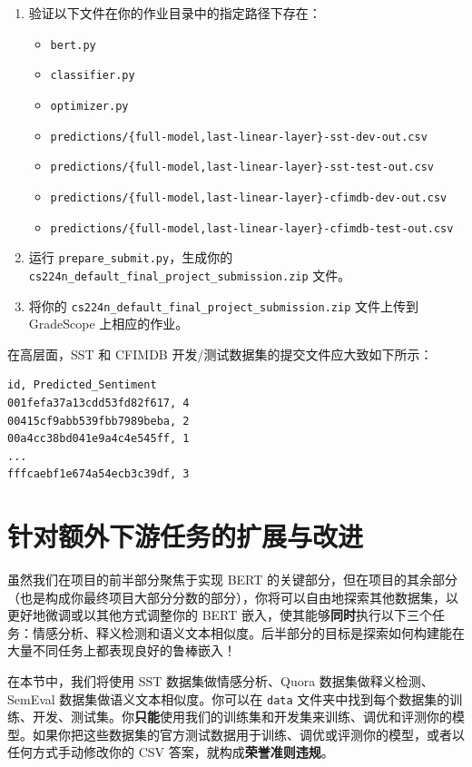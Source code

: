 \documentclass[11pt]{article}
\begin{document}
\begin{enumerate}
  \item 验证以下文件在你的作业目录中的指定路径下存在：
    \begin{itemize}
      \item \texttt{bert.py}
      \item \texttt{classifier.py}
      \item \texttt{optimizer.py}
      \item \texttt{predictions/\{full-model,last-linear-layer\}-sst-dev-out.csv}
      \item \texttt{predictions/\{full-model,last-linear-layer\}-sst-test-out.csv}
      \item \texttt{predictions/\{full-model,last-linear-layer\}-cfimdb-dev-out.csv}
      \item \texttt{predictions/\{full-model,last-linear-layer\}-cfimdb-test-out.csv}
    \end{itemize}
  \item 运行 \texttt{prepare\_submit.py}，生成你的 \texttt{cs224n\_default\_final\_project\_submission.zip} 文件。
  \item 将你的 \texttt{cs224n\_default\_final\_project\_submission.zip} 文件上传到 GradeScope 上相应的作业。
\end{enumerate}

在高层面，SST 和 CFIMDB 开发/测试数据集的提交文件应大致如下所示：

\begin{lstlisting}[numbers=none]
id, Predicted_Sentiment
001fefa37a13cdd53fd82f617, 4
00415cf9abb539fbb7989beba, 2
00a4cc38bd041e9a4c4e545ff, 1
...
fffcaebf1e674a54ecb3c39df, 3
\end{lstlisting}

\section{针对额外下游任务的扩展与改进}

虽然我们在项目的前半部分聚焦于实现 BERT 的关键部分，但在项目的其余部分（也是构成你最终项目大部分分数的部分），你将可以自由地探索其他数据集，以更好地微调或以其他方式调整你的 BERT 嵌入，使其能够\textbf{同时}执行以下三个任务：情感分析、释义检测和语义文本相似度。后半部分的目标是探索如何构建能在大量不同任务上都表现良好的鲁棒嵌入！

在本节中，我们将使用 SST 数据集做情感分析、Quora 数据集做释义检测、SemEval 数据集做语义文本相似度。你可以在 \texttt{data} 文件夹中找到每个数据集的训练、开发、测试集。你\textbf{只能}使用我们的训练集和开发集来训练、调优和评测你的模型。如果你把这些数据集的官方测试数据用于训练、调优或评测你的模型，或者以任何方式手动修改你的 CSV 答案，就构成\textbf{荣誉准则违规}。
\end{document}
